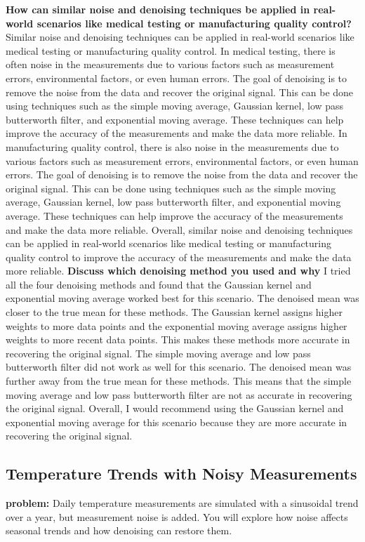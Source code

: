 \documentclass[a4paper,12pt]{article} %
\begin{document}
\textbf{How can similar noise and denoising techniques be applied in real-world scenarios
like medical testing or manufacturing quality control?}
Similar noise and denoising techniques can be applied in real-world scenarios like medical testing or manufacturing quality control. In medical testing, there is often noise in the measurements due to various factors such as measurement errors, environmental factors, or even human errors. The goal of denoising is to remove the noise from the data and recover the original signal. This can be done using techniques such as the simple moving average, Gaussian kernel, low pass butterworth filter, and exponential moving average. These techniques can help improve the accuracy of the measurements and make the data more reliable. In manufacturing quality control, there is also noise in the measurements due to various factors such as measurement errors, environmental factors, or even human errors. The goal of denoising is to remove the noise from the data and recover the original signal. This can be done using techniques such as the simple moving average, Gaussian kernel, low pass butterworth filter, and exponential moving average. These techniques can help improve the accuracy of the measurements and make the data more reliable. Overall, similar noise and denoising techniques can be applied in real-world scenarios like medical testing or manufacturing quality control to improve the accuracy of the measurements and make the data more reliable.
\newline\newline
\textbf{Discuss which denoising method you used and why}
I tried all the four denoising methods and found that the Gaussian kernel and exponential moving average worked best for this scenario. The denoised mean was closer to the true mean for these methods. The Gaussian kernel assigns higher weights to more data points and the exponential moving average assigns higher weights to more recent data points. This makes these methods more accurate in recovering the original signal. The simple moving average and low pass butterworth filter did not work as well for this scenario. The denoised mean was further away from the true mean for these methods. This means that the simple moving average and low pass butterworth filter are not as accurate in recovering the original signal. Overall, I would recommend using the Gaussian kernel and exponential moving average for this scenario because they are more accurate in recovering the original signal.
\subsection{Temperature Trends with Noisy Measurements}
\textbf{problem: } Daily temperature measurements are simulated with a sinusoidal trend over a
year, but measurement noise is added. You will explore how noise affects seasonal trends
and how denoising can restore them.
\end{document}
